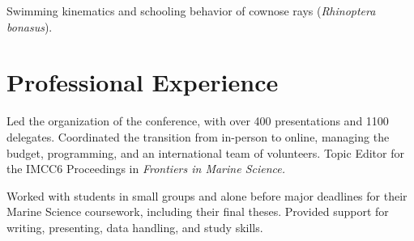 \documentclass[a4paper]{deedy-resume} %
\begin{document}
\sectionspace %



Swimming kinematics and schooling behavior of cownose rays (\textit{Rhinoptera bonasus}).

\sectionspace %



\sectionspace %

\section{Professional Experience}


Led the organization of the conference, with over 400 presentations and 1100 delegates. Coordinated the transition from in-person to online, managing the budget, programming, and an international team of volunteers. Topic Editor for the IMCC6 Proceedings in \textit{Frontiers in Marine Science.}

\sectionspace



Worked with students in small groups and alone before major deadlines for their Marine Science coursework, including their final theses. Provided support for writing, presenting, data handling, and study skills.

\sectionspace


\newpage %

\end{document}
